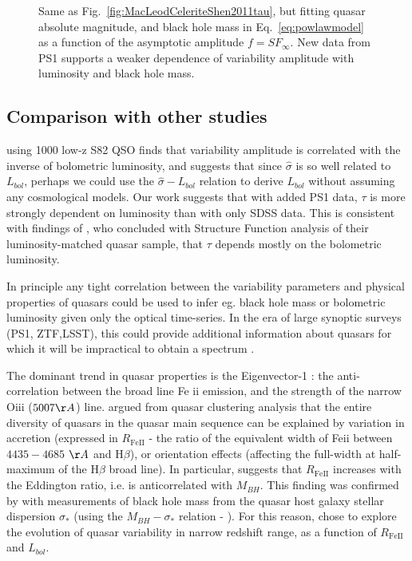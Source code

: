 \documentclass[twocolumn]{aastex62}
\begin{document}
\begin{figure*}
\caption{Same as Fig.~\ref{fig:MacLeodCeleriteShen2011tau},  but fitting quasar absolute magnitude, and black hole mass  in Eq.~\ref{eq:powlawmodel} as a function of the asymptotic amplitude $f = SF_{\infty}$. New data from PS1 supports a weaker dependence of variability amplitude with luminosity and black hole mass. }
\label{fig:MacLeodCeleriteShen2011sf}
\end{figure*} 


\subsection{Comparison with other studies}


\cite{sun2018} using 1000 low-z S82 QSO finds that variability amplitude is correlated with the inverse of bolometric luminosity, and suggests that since $\hat{\sigma}$ is so well related to $L
_{bol}$, perhaps we could use the $\hat{\sigma} - L_{bol}$ relation to derive $L_{bol}$ without assuming any cosmological models. Our work suggests that with added PS1 data, $\tau$ is more strongly dependent on luminosity than with only SDSS data.  This is consistent with findings of \cite{sun2018}, who concluded with Structure Function analysis of their luminosity-matched quasar sample, that $\tau$ depends mostly on the bolometric luminosity. 



In principle any tight correlation between the variability parameters and physical properties of quasars could be used to infer eg.  black hole mass or bolometric luminosity  given only the optical time-series. In the era of large synoptic surveys (PS1, ZTF,LSST), this could provide additional information about quasars for which it will be impractical to obtain a spectrum \citep{sanchez2018}.


The dominant trend in quasar properties is the Eigenvector-1 : the anti-correlation between the broad line Fe {\sc ii} emission, and the strength of the narrow O{\sc iii} ($5007 \AA$) line\cite{wang1996}. \citep{shen2014} argued from quasar clustering analysis that the entire diversity of quasars in  the quasar main sequence can be explained by variation in accretion (expressed in $R_{\mathrm{Fe  II}}$ - the ratio of the equivalent width of   Fe{\sc ii}  between $4435-4685$ $\AA$ and H$\beta$), or orientation effects (affecting the full-width at half-maximum of the H$\beta$ broad line). In particular, \citep{shen2014} suggests that $R_{\mathrm{Fe  II}}$ increases with  the Eddington ratio, i.e. is anticorrelated with $M_{BH}$. This finding was confirmed by \cite{sun2015} with measurements of black hole mass from the quasar host galaxy stellar dispersion $\sigma_{*}$ (using the $M_{BH} - \sigma_{*}$ relation - \citealt{ferrarese2000, kormendy2013}). For this reason,  \citep{sun2018} chose to explore the evolution of quasar variability in narrow redshift range, as a function of  $R_{\mathrm{Fe  II}}$ and $L_{bol}$. 
\end{document}
